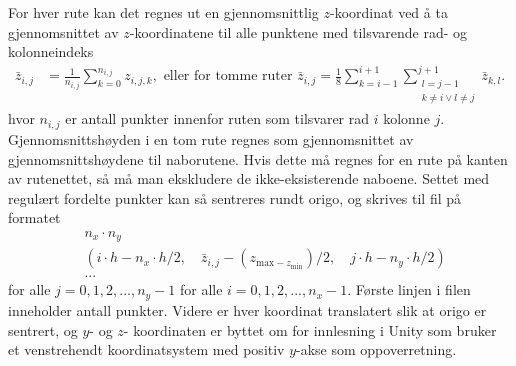 \documentclass[norsk, doc, 11pt, a4paper]{apa7}  %
\begin{document}
For hver rute kan det regnes ut en gjennomsnittlig \(z\)-koordinat ved å ta gjennomsnittet av \(z\)-koordinatene til alle punktene med tilsvarende rad- og kolonneindeks
\begin{align*}
	\bar{z}_{i,j} &= \frac{1}{n_{i,j}}\sum_{k = 0}^{n_{i,j}}z_{i,j,k},\text{ eller for tomme ruter }
	\bar{z}_{i,j} = \frac{1}{8}\sum_{k=i-1}^{i+1}\sum_{\substack{l=j-1 \\ k\neq i \lor l\neq j}}^{j+1} \bar{z}_{k,l}.
\end{align*}
hvor \(n_{i,j}\) er antall punkter innenfor ruten som tilsvarer rad \(i\) kolonne \(j\). Gjennomsnittshøyden i en tom rute regnes som gjennomsnittet av gjennomsnittshøydene til naborutene.
Hvis dette må regnes for en rute på kanten av rutenettet, så må man ekskludere de ikke-eksisterende naboene.
Settet med regulært fordelte punkter kan så sentreres rundt origo, og skrives til fil på formatet
\begin{align*}
	&n_{x}\cdot n_{y} \\
	&(i\cdot h - n_{x}\cdot h/2,\quad \bar{z}_{i,j} - (z_{\text{max} - z_{\text{min}}})/2,\quad j\cdot h - n_{y}\cdot h/2) \\
	&...
\end{align*}
for alle \(j=0,1,2,...,n_{y}-1\) for alle \(i=0,1,2,...,n_{x}-1\). Første linjen i filen inneholder antall punkter. Videre er hver koordinat translatert slik at origo er sentrert, og \(y\)- og \(z\)- koordinaten er byttet om for innlesning i Unity \parencite{UnityEngine2023} som bruker et venstrehendt koordinatsystem med positiv \(y\)-akse som oppoverretning.
\end{document}
